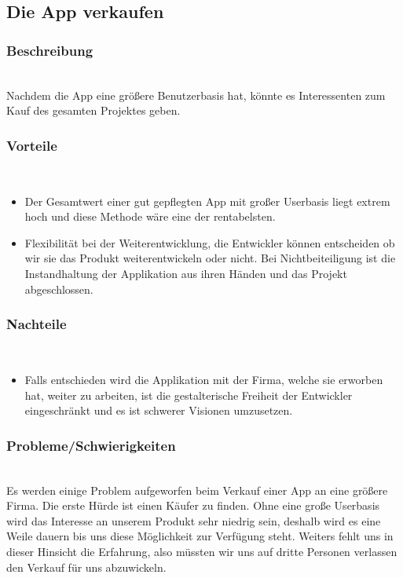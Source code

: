\documentclass[FIPLY_base.tex]{subfiles}
\begin{document}
\subsection{Die App verkaufen}


\subsubsection{Beschreibung}\ \\
Nachdem die App eine größere Benutzerbasis hat, könnte es Interessenten zum Kauf des gesamten Projektes geben.


\subsubsection{Vorteile}\ \\
\begin{itemize}
\item Der Gesamtwert einer gut gepflegten App mit großer Userbasis liegt extrem hoch und diese Methode wäre eine der rentabelsten.
\item Flexibilität bei der Weiterentwicklung, die Entwickler können entscheiden ob wir sie das Produkt weiterentwickeln oder nicht. Bei Nichtbeiteiligung ist die Instandhaltung der Applikation aus ihren Händen und das Projekt abgeschlossen.
\end{itemize}

\subsubsection{Nachteile}\ \\
\begin{itemize}
\item Falls entschieden wird die Applikation mit der Firma, welche sie erworben hat, weiter zu arbeiten, ist die gestalterische Freiheit der Entwickler eingeschränkt und es ist schwerer Visionen umzusetzen.
\end{itemize}


\subsubsection{Probleme/Schwierigkeiten}\ \\
Es werden einige Problem aufgeworfen beim Verkauf einer App an eine größere Firma. Die erste Hürde ist einen Käufer zu finden.
Ohne eine große Userbasis wird das Interesse an unserem Produkt sehr niedrig sein, deshalb wird es eine Weile dauern bis uns diese Möglichkeit zur Verfügung steht.
Weiters fehlt uns in dieser Hinsicht die Erfahrung, also müssten wir uns auf dritte Personen verlassen den Verkauf für uns abzuwickeln.
\end{document}
